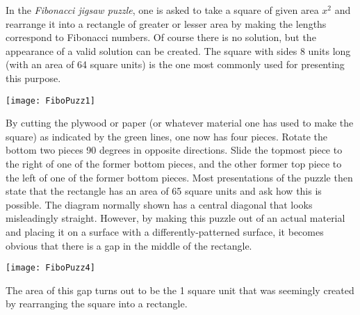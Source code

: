 \documentclass[12pt]{article}
\begin{document}
In the \emph{Fibonacci jigsaw puzzle}, one is asked to take a square of given area $x^2$ and rearrange it into a rectangle of greater or lesser area by making the lengths correspond to Fibonacci numbers. Of course there is no solution, but the appearance of a valid solution can be created. The square with sides 8 units long (with an area of 64 square units) is the one most commonly used for presenting this purpose.

\begin{center}
\texttt{[image: FiboPuzz1]}
\end{center}

By cutting the plywood or paper (or whatever material one has used to make the square) as indicated by the green lines, one now has four pieces. Rotate the bottom two pieces 90 degrees in opposite directions. Slide the topmost piece to the right of one of the former bottom pieces, and the other former top piece to the left of one of the former bottom pieces. Most presentations of the puzzle then state that the rectangle has an area of 65 square units and ask how this is possible. The diagram normally shown has a central diagonal that looks misleadingly straight. However, by making this puzzle out of an actual material and placing it on a surface with a differently-patterned surface, it becomes obvious that  there is a gap in the middle of the rectangle.

\begin{center}
\texttt{[image: FiboPuzz4]}
\end{center}

The area of this gap turns out to be the 1 square unit that was seemingly created by rearranging the square into a rectangle.
\end{document}
